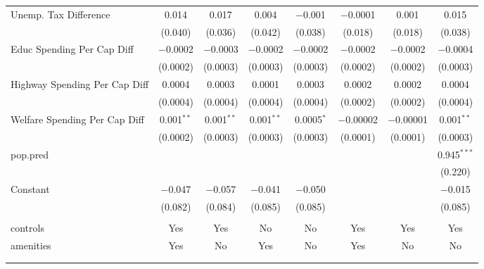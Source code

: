 \begin{table}[!htbp]
\begin{tabular}{@{\extracolsep{5pt}}lccccccc}
  Unemp. Tax Difference & 0.014 & 0.017 & 0.004 & $-$0.001 & $-$0.0001 & 0.001 & 0.015 \\ 
  & (0.040) & (0.036) & (0.042) & (0.038) & (0.018) & (0.018) & (0.038) \\ 
  Educ Spending Per Cap Diff & $-$0.0002 & $-$0.0003 & $-$0.0002 & $-$0.0002 & $-$0.0002 & $-$0.0002 & $-$0.0004 \\ 
  & (0.0002) & (0.0003) & (0.0003) & (0.0003) & (0.0002) & (0.0002) & (0.0003) \\ 
  Highway Spending Per Cap Diff & 0.0004 & 0.0003 & 0.0001 & 0.0003 & 0.0002 & 0.0002 & 0.0004 \\ 
  & (0.0004) & (0.0004) & (0.0004) & (0.0004) & (0.0002) & (0.0002) & (0.0004) \\ 
  Welfare Spending Per Cap Diff & 0.001$^{**}$ & 0.001$^{**}$ & 0.001$^{**}$ & 0.0005$^{*}$ & $-$0.00002 & $-$0.00001 & 0.001$^{**}$ \\ 
  & (0.0002) & (0.0003) & (0.0003) & (0.0003) & (0.0001) & (0.0001) & (0.0003) \\ 
  pop.pred &  &  &  &  &  &  & 0.945$^{***}$ \\ 
  &  &  &  &  &  &  & (0.220) \\ 
  Constant & $-$0.047 & $-$0.057 & $-$0.041 & $-$0.050 &  &  & $-$0.015 \\ 
  & (0.082) & (0.084) & (0.085) & (0.085) &  &  & (0.085) \\ 
 \hline \\[-1.8ex] 
controls & Yes & Yes & No & No & Yes & Yes & Yes \\ 
amenities & Yes & No & Yes & No & Yes & No & No \\ 
\hline \\[-1.8ex] 
\hline 
\hline \\[-1.8ex] 
\end{tabular} 
\end{table} 
